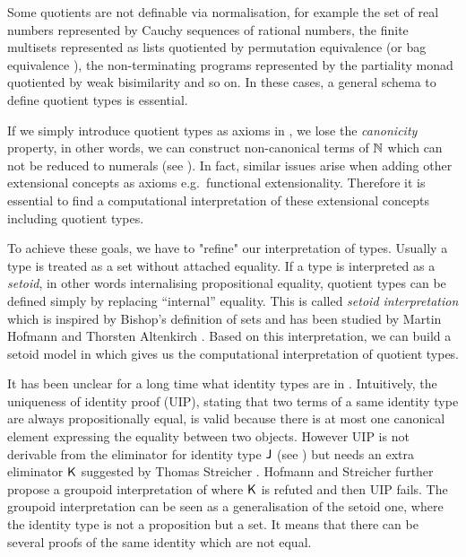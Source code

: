 Some quotients are not definable via normalisation, for example the
set of real numbers represented by Cauchy sequences of rational
numbers, the finite multisets represented as lists quotiented by
permutation equivalence (or bag equivalence
\cite{DBLP:conf/itp/Danielsson12}), the non-terminating programs
represented by the partiality monad quotiented by weak bisimilarity
and so on. In these cases, a general schema to define quotient types
is essential.

If we simply introduce quotient types as axioms in \itt, we lose the
\emph{canonicity} property, in other words, we can construct
non-canonical terms of $\mathbb{N}$ which can not be reduced to numerals (see
). In fact, similar issues arise when adding
other extensional concepts as axioms e.g.\ functional
extensionality. Therefore it is essential to find a computational
interpretation of these extensional concepts including quotient types.

To achieve these goals, we have to "refine" our interpretation of
types. Usually a type is treated as a set without attached
equality. If a type is interpreted as a \emph{setoid}, in other words
internalising propositional equality, quotient types can be defined
simply by replacing ``internal'' equality. This is called \emph{setoid
  interpretation} which is inspired by Bishop's \cite{bishop}
definition of sets and has been studied by Martin Hofmann
\cite{hof:phd,hof:95:sm} and Thorsten Altenkirch
\cite{alti:lics99,alti:ott-conf}. Based on this interpretation, we can
build a setoid model in \itt which gives us the computational
interpretation of quotient types.

It has been unclear for a long time what identity types are in \itt. Intuitively, the uniqueness of identity proof (UIP), stating that two terms of a same identity type are always propositionally equal, is valid because there is at most one canonical element expressing the equality between two objects. However UIP is not derivable from the eliminator for identity type $\operatorname{\mathsf{J}}$ (see ) but needs an extra eliminator $\operatorname{\mathsf{K}}$ suggested by Thomas Streicher \cite{streicherinvestigations}.
Hofmann and Streicher further \cite{MR1686862} propose a groupoid interpretation of \itt where $\operatorname{\mathsf{K}}$ is refuted and then UIP fails. The groupoid interpretation  can be seen as a generalisation of the setoid one, where the identity type is not a proposition but a set. It means that there can be several proofs of the same identity which are not equal.

